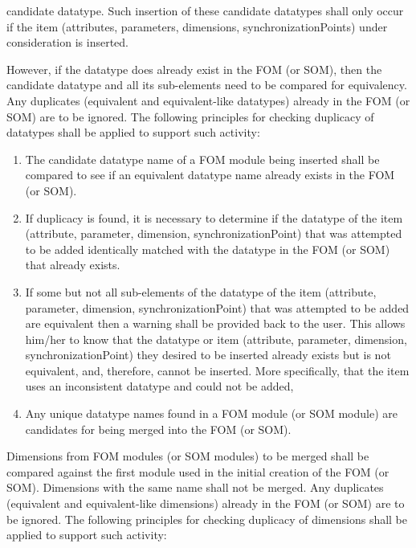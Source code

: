 \newpage
\begingroup
\annexcbodyfont
\setlength{\parskip}{12pt plus 1pt minus 1pt}
candidate datatype. Such insertion of these candidate datatypes shall only occur if the item (attributes, parameters, dimensions, synchronizationPoints) under consideration is inserted.

However, if the datatype does already exist in the FOM (or SOM), then the candidate datatype and all its sub-elements need to be compared for equivalency. Any duplicates (equivalent and equivalent-like datatypes) already in the FOM (or SOM) are to be ignored. The following principles for checking duplicacy of datatypes shall be applied to support such activity:

\begin{enumerate}[leftmargin=52pt,labelsep=12pt,label=\arabic*),itemsep=3.2pt,topsep=-2pt,partopsep=0pt,parsep=0pt]
\item The candidate datatype name of a FOM module being inserted shall be compared to see if an equivalent datatype name already exists in the FOM (or SOM).
\item If duplicacy is found, it is necessary to determine if the datatype of the item (attribute, parameter, dimension, synchronizationPoint) that was attempted to be added identically matched with the datatype in the FOM (or SOM) that already exists.
\item If some but not all sub-elements of the datatype of the item (attribute, parameter, dimension, synchronizationPoint) that was attempted to be added are equivalent then a warning shall be provided back to the user. This allows him/her to know that the datatype or item (attribute, parameter, dimension, synchronizationPoint) they desired to be inserted already exists but is not equivalent, and, therefore, cannot be inserted. More specifically, that the item uses an inconsistent datatype and could not be added,
\item Any unique datatype names found in a FOM module (or SOM module) are candidates for being merged into the FOM (or SOM).
\end{enumerate}

\vspace{5.2pt}
Dimensions from FOM modules (or SOM modules) to be merged shall be compared against the first module used in the initial creation of the FOM (or SOM). Dimensions with the same name shall not be merged. Any duplicates (equivalent and equivalent-like dimensions) already in the FOM (or SOM) are to be ignored. The following principles for checking duplicacy of dimensions shall be applied to support such activity:

